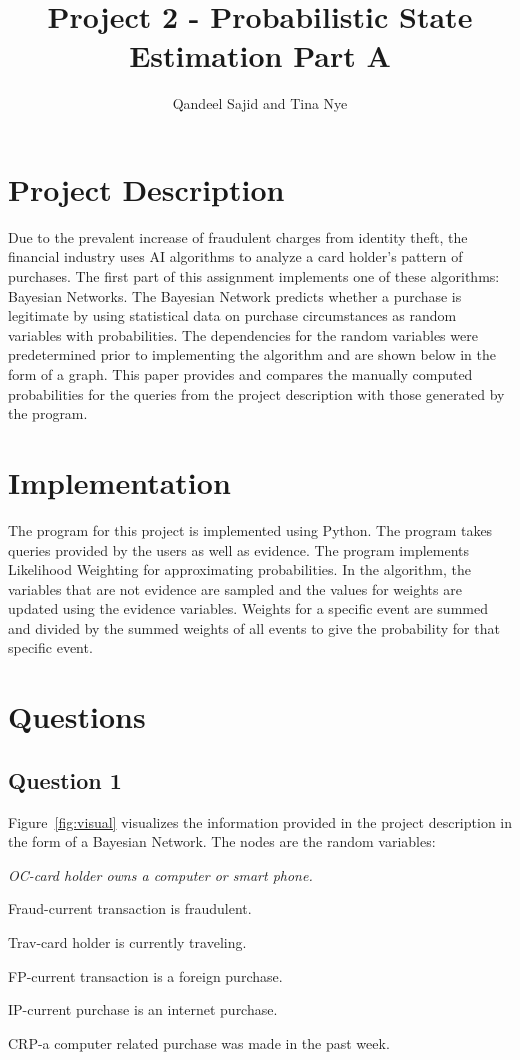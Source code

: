 \documentclass[a4paper,11pt]{report}
\title{Project 2 - Probabilistic State Estimation Part A}
\author{Qandeel Sajid and Tina Nye}
\begin{document}
\maketitle

\newpage
\tableofcontents
\newpage

\section{Project Description}
Due to the prevalent increase of fraudulent charges from identity theft, the financial industry uses AI algorithms to analyze a card holder's pattern of purchases.  The first part of this assignment implements one of these algorithms: Bayesian Networks.  The Bayesian Network predicts whether a purchase is legitimate by using statistical data on purchase circumstances as random variables with probabilities.  The dependencies for the random variables were predetermined prior to implementing the algorithm and are shown below in the form of a graph. This paper provides and compares the manually computed probabilities for the queries from the project description with those generated by the program.

\section{Implementation}
The program for this project is implemented using Python. The program takes queries provided by the users as well as evidence. The program implements Likelihood Weighting for approximating probabilities. In the algorithm, the variables that are not evidence are sampled and the values for weights are updated using the evidence variables. Weights for a specific event are summed and divided by the summed weights of all events to give the probability for that specific event.


\section{Questions}
	\subsection{Question 1}
	 Figure~\ref{fig:visual} visualizes the information provided in the project description in the form of a Bayesian Network. The nodes are the random variables:

	{\it OC-card holder owns a computer or smart phone.
	
	Fraud-current transaction is fraudulent.
	
	Trav-card holder is currently traveling.
	
	FP-current transaction is a foreign purchase.
	
	IP-current purchase is an internet purchase.
	
	CRP-a computer related purchase was made in the past week.} 
\end{document}
